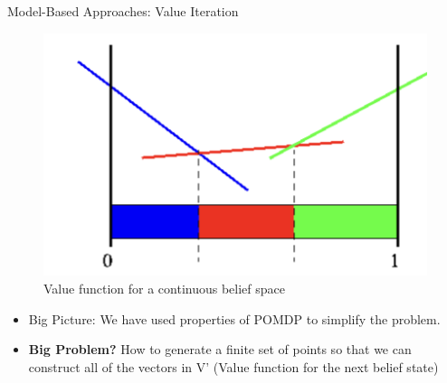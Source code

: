 \documentclass[presentation, smaller]{beamer}
\begin{document}
\begin{frame}{Model-Based Approaches: Value Iteration}
\begin{figure}
    \centering
    \includegraphics[scale = 0.2]{pic_3.png}
    \caption{Value function for a continuous belief space}
    \label{fig:enter-label}
\end{figure}
\begin{itemize}
    \item Big Picture: We have used properties of POMDP to simplify the problem.
    \item \textbf{Big Problem?} How to generate a finite set of points so that we can construct all of the vectors in V' (Value function for the next belief state)
\end{itemize}
\end{frame}
\end{document}
